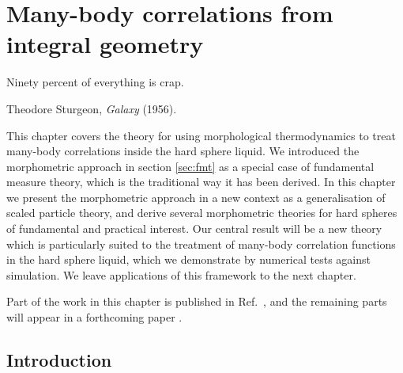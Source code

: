 \documentclass[11pt,twoside]{report}
\begin{document}
\chapter{Many-body correlations from integral geometry}
\epigraph{Ninety percent of everything is crap.}{Theodore Sturgeon, \emph{Galaxy} (1956).}
\label{chapter:morphometric-framework}


This chapter covers the theory for using morphological thermodynamics to treat many-body correlations inside the hard sphere liquid.
We introduced the morphometric approach in section \ref{sec:fmt} as a special case of fundamental measure theory, which is the traditional way it has been derived.
In this chapter we present the morphometric approach in a new context as a generalisation of scaled particle theory, and derive several morphometric theories for hard spheres of fundamental and practical interest.
Our central result will be a new theory which is particularly suited to the treatment of many-body correlation functions in the hard sphere liquid, which we demonstrate by numerical tests against simulation.
We leave applications of this framework to the next chapter.

Part of the work in this chapter is published in Ref.\ \cite{RobinsonPRL2019}, and the remaining parts will appear in a forthcoming paper \cite{RobinsonPRE2019}.

\section{Introduction}
\end{document}
